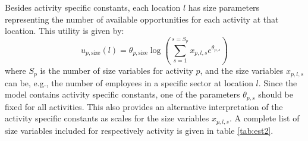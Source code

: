 Besides activity specific constants, each location $l$ has size parameters representing the number of available opportunities for each activity at that location. This utility is given by:
\begin{equation*}
u_{p,\text{size}}(l) =\theta_{p,\text{size}}\log \left( \sum_{s=1}^{s=S_p} x_{p,l,s}e^{\theta_{p,s}} \right)
\end{equation*}
where $S_p$ is the number of size variables for activity $p$, and the size variables $x_{p,l,s}$ can be, e.g., the number of employees in a specific sector at location $l$. Since the model contains activity specific constants, one of the parameters $\theta_{p,s}$ should be fixed for all activities. This also provides an alternative interpretation of the activity specific constants as scales for the size variables $x_{p,l,s}$. A complete list of size variables included for respectively activity is given in table \ref{tab:est2}. 

%


%
%


%
